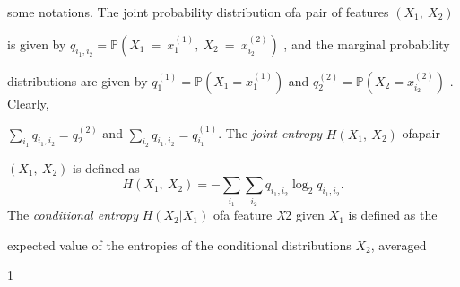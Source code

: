 \documentclass[a4paper,12pt]{article}
\begin{document}
some notations. The joint probability distribution ofa pair of features $(X_{1},\ X_{2})$

is given by $q_{i_{1},i_{2}} = \mathbb{P} (X_{1}\ =\ x_{1}^{(1)},\ X_{2}\ =\ x_{i_{2}}^{(2)})$ , and the marginal probability

distributions are given by $q_{1}^{(1)} =\mathbb{P}(X_{1}=x_{1}^{(1)})$ and $q_{2}^{(2)} =\mathbb{P}(X_{2}=x_{i_{2}}^{(2)})$ . Clearly,

$\displaystyle \sum_{i_{1}}q_{i_{1},i_{2}} =q_{2}^{(2)}$ and $\displaystyle \sum_{i_{2}}q_{i_{1},i_{2}} =q_{i_{1}}^{(1)}$. The {\it joint entropy} $H(X_{1},\ X_{2})$ ofapair

$(X_{1},\ X_{2})$ is defined as
$$
H(X_{1},\ X_{2})=-\sum_{i_{1}}\sum_{i_{2}}q_{i_{1},i_{2}}\log_{2}q_{i_{1},i_{2}}.
$$
The {\it conditional entropy} $H(X_{2}|X_{1})$ ofa feature {\it X}2 given $X_{1}$ is defined as the

expected value of the entropies of the conditional distributions $X_{2}$, averaged

1
\end{document}
